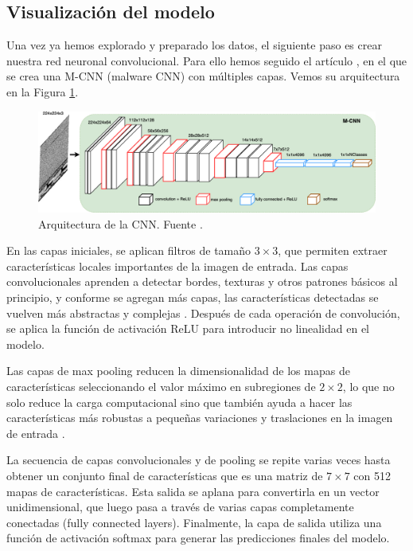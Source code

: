 \subsection{Visualización del modelo} \label{sec: visMalware}


Una vez ya hemos explorado y preparado los datos, el siguiente paso es crear nuestra red neuronal convolucional. Para ello hemos seguido el artículo \citep{kalash2018malware}, en el que se crea una M-CNN (malware CNN) con múltiples capas. Vemos su arquitectura en la Figura \ref{img: cnnMMC}.

\begin{figure}[h]
    \begin{center}
    \includegraphics[width=\textwidth]{img/cnnMMC.png}
    \end{center}
    \caption{Arquitectura de la CNN. Fuente \citep{kalash2018malware}.}
    \label{img: cnnMMC}
\end{figure}

En las capas iniciales, se aplican filtros de tamaño $3 \times 3$, que permiten extraer características locales importantes de la imagen de entrada. Las capas convolucionales aprenden a detectar bordes, texturas y otros patrones básicos al principio, y conforme se agregan más capas, las características detectadas se vuelven más abstractas y complejas \citep{geron2022hands}. Después de cada operación de convolución, se aplica la función de activación ReLU para introducir no linealidad en el modelo.

Las capas de max pooling reducen la dimensionalidad de los mapas de características seleccionando el valor máximo en subregiones de $2 \times 2$, lo que no solo reduce la carga computacional sino que también ayuda a hacer las características más robustas a pequeñas variaciones y traslaciones en la imagen de entrada \citep{geron2022hands}.

La secuencia de capas convolucionales y de pooling se repite varias veces hasta obtener un conjunto final de características que es una matriz de $7 \times 7$ con 512 mapas de características. Esta salida se aplana para convertirla en un vector unidimensional, que luego pasa a través de varias capas completamente conectadas (fully connected layers). Finalmente, la capa de salida utiliza una función de activación softmax para generar las predicciones finales del modelo.

